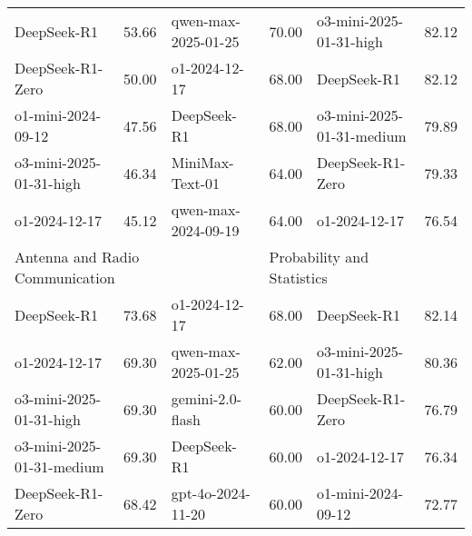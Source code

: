 {\begin{longtable}{p{4.2cm}>{\centering\arraybackslash} p{0.8cm}|p{4.2cm} >{\centering\arraybackslash} p{0.8cm}|p{4.2cm} >{\centering\arraybackslash} p{0.8cm}}
\hline
\cellcolor{blue!5} DeepSeek-R1 & \cellcolor{blue!2}53.66 & \cellcolor{orange!5} qwen-max-2025-01-25 & \cellcolor{orange!2} 70.00 & \cellcolor{green!5} o3-mini-2025-01-31-high & \cellcolor{green!2} 82.12\\
\cellcolor{blue!5} DeepSeek-R1-Zero & \cellcolor{blue!2}50.00 & \cellcolor{orange!5} o1-2024-12-17 & \cellcolor{orange!2} 68.00 & \cellcolor{green!5} DeepSeek-R1 & \cellcolor{green!2} 82.12\\
\cellcolor{blue!5} o1-mini-2024-09-12 & \cellcolor{blue!2}47.56 & \cellcolor{orange!5} DeepSeek-R1 & \cellcolor{orange!2} 68.00 & \cellcolor{green!5} o3-mini-2025-01-31-medium & \cellcolor{green!2} 79.89\\
\cellcolor{blue!5} o3-mini-2025-01-31-high & \cellcolor{blue!2}46.34 & \cellcolor{orange!5} MiniMax-Text-01 & \cellcolor{orange!2} 64.00 & \cellcolor{green!5} DeepSeek-R1-Zero & \cellcolor{green!2} 79.33\\
\cellcolor{blue!5} o1-2024-12-17 & \cellcolor{blue!2}45.12 & \cellcolor{orange!5} qwen-max-2024-09-19 & \cellcolor{orange!2} 64.00 & \cellcolor{green!5} o1-2024-12-17 & \cellcolor{green!2} 76.54\\
\hline
\multicolumn{2}{p{5.15cm}|}{\cellcolor{blue!10} \centering Antenna and Radio Communication} & \multicolumn{2}{p{5.15cm}|}{\cellcolor{yellow!10} \centering Forensic Medicine} & \multicolumn{2}{p{5.15cm}}{\cellcolor{green!10} \centering Probability and Statistics}\\
\hline
\cellcolor{blue!5} DeepSeek-R1 & \cellcolor{blue!2}73.68 & \cellcolor{yellow!5} o1-2024-12-17 & \cellcolor{yellow!2} 68.00 & \cellcolor{green!5} DeepSeek-R1 & \cellcolor{green!2} 82.14\\
\cellcolor{blue!5} o1-2024-12-17 & \cellcolor{blue!2}69.30 & \cellcolor{yellow!5} qwen-max-2025-01-25 & \cellcolor{yellow!2} 62.00 & \cellcolor{green!5} o3-mini-2025-01-31-high & \cellcolor{green!2} 80.36\\
\cellcolor{blue!5} o3-mini-2025-01-31-high & \cellcolor{blue!2}69.30 & \cellcolor{yellow!5} gemini-2.0-flash & \cellcolor{yellow!2} 60.00 & \cellcolor{green!5} DeepSeek-R1-Zero & \cellcolor{green!2} 76.79\\
\cellcolor{blue!5} o3-mini-2025-01-31-medium & \cellcolor{blue!2}69.30 & \cellcolor{yellow!5} DeepSeek-R1 & \cellcolor{yellow!2} 60.00 & \cellcolor{green!5} o1-2024-12-17 & \cellcolor{green!2} 76.34\\
\cellcolor{blue!5} DeepSeek-R1-Zero & \cellcolor{blue!2}68.42 & \cellcolor{yellow!5} gpt-4o-2024-11-20 & \cellcolor{yellow!2} 60.00 & \cellcolor{green!5} o1-mini-2024-09-12 & \cellcolor{green!2} 72.77\\

\end{longtable}}
